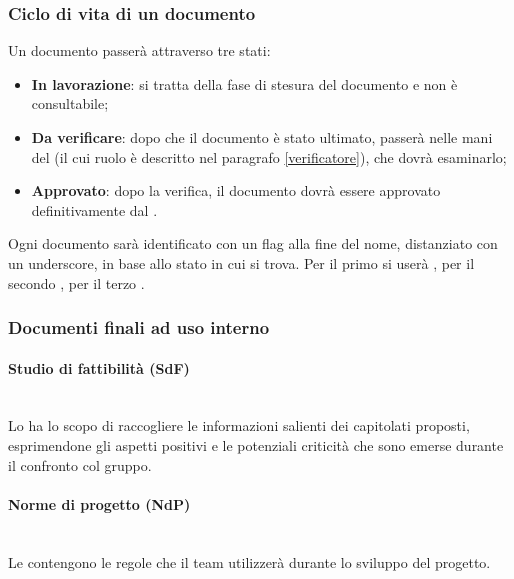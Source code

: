 	\subsubsection{Ciclo di vita di un documento}
	Un documento passerà attraverso tre stati:
	\begin{itemize}
		\item \textbf{In lavorazione}:
		si tratta della fase di stesura del documento e non è consultabile;
		\item \textbf{Da verificare}:
		dopo che il documento è stato ultimato, passerà nelle mani del \ver{} (il cui ruolo è descritto nel paragrafo \ref{verificatore}), che dovrà esaminarlo;
		\item \textbf{Approvato}:
		dopo la verifica, il documento dovrà essere approvato definitivamente dal \RdP.
	\end{itemize}
	Ogni documento sarà identificato con un flag alla fine del nome, distanziato con un underscore, in base allo stato in cui si trova. 
	Per il primo si userà \emph{}, per il secondo \emph{}, per il terzo \emph{}.
	
	\subsubsection{Documenti finali ad uso interno}
		\paragraph{Studio di fattibilità (SdF)}
		~\\Lo \SdF{} ha lo scopo di raccogliere le informazioni salienti dei capitolati proposti, esprimendone gli aspetti positivi e 
		le potenziali criticità che sono emerse durante il confronto col gruppo.
		\paragraph{Norme di progetto (NdP)}
		~\\Le \NdP{} contengono le regole che il team utilizzerà durante lo sviluppo del progetto.

